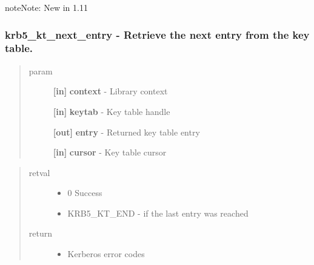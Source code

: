 \documentclass[letterpaper,10pt,english]{sphinxmanual}
\begin{document}
\begin{notice}{note}{Note:}
New in 1.11
\end{notice}


\subsubsection{krb5\_kt\_next\_entry -  Retrieve the next entry from the key table.}
\label{appdev/refs/api/krb5_kt_next_entry:krb5-kt-next-entry-retrieve-the-next-entry-from-the-key-table}\label{appdev/refs/api/krb5_kt_next_entry::doc}

\begin{fulllineitems}
\label{appdev/refs/api/krb5_kt_next_entry:c.krb5_kt_next_entry}
\end{fulllineitems}

\begin{quote}\begin{description}
\item[{param}] \leavevmode
\textbf{{[}in{]}} \textbf{context} - Library context

\textbf{{[}in{]}} \textbf{keytab} - Key table handle

\textbf{{[}out{]}} \textbf{entry} - Returned key table entry

\textbf{{[}in{]}} \textbf{cursor} - Key table cursor

\end{description}\end{quote}
\begin{quote}\begin{description}
\item[{retval}] \leavevmode\begin{itemize}
\item {} 
0   Success

\item {} 
KRB5\_KT\_END   - if the last entry was reached

\end{itemize}

\item[{return}] \leavevmode\begin{itemize}
\item {} 
Kerberos error codes

\end{itemize}

\end{description}\end{quote}
\end{document}
